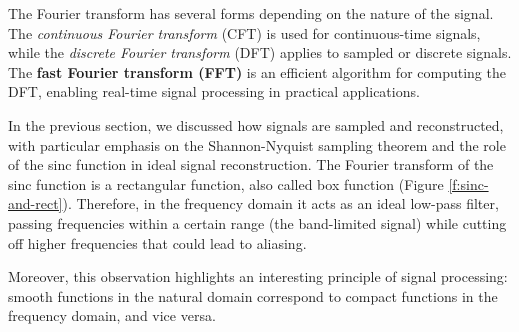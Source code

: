 

The Fourier transform has several forms depending on the nature of the signal. The \textit{continuous Fourier transform} (CFT) is used for continuous-time signals, while the \textit{discrete Fourier transform} (DFT) applies to sampled or discrete signals. The \textbf{fast Fourier transform (FFT)} is an efficient algorithm for computing the DFT, enabling real-time signal processing in practical applications.

In the previous section, we discussed how signals are sampled and reconstructed, with particular emphasis on the Shannon-Nyquist sampling theorem and the role of the sinc function in ideal signal reconstruction. The Fourier transform of the sinc function is a rectangular function, also called box function (Figure \ref{f:sinc-and-rect}). Therefore, in the frequency domain it acts as an ideal low-pass filter, passing frequencies within a certain range (the band-limited signal) while cutting off higher frequencies that could lead to aliasing.

Moreover, this observation highlights an interesting principle of signal processing: smooth functions in the natural domain correspond to compact functions in the frequency domain, and vice versa.



